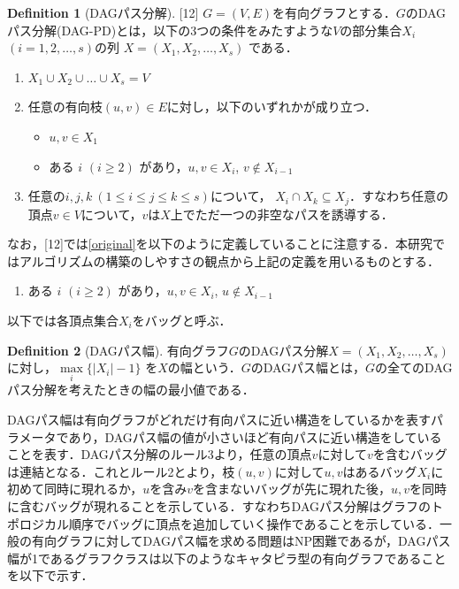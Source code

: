 \documentclass[master]{kuisthesis}		%
\theoremstyle{plain}
\theoremstyle{definition}
\newtheorem{definition*}{Definition}
\begin{document}
\begin{definition*}[DAGパス分解][12]
    $G=(V, E)$を有向グラフとする．$G$のDAGパス分解(DAG-PD)とは，以下の3つの条件をみたすような$V$の部分集合$X_i$ $(i = 1, 2,  \dots, s)$の列 $X=(X_1, X_2,  \dots, X_s)$ である．
    
    \begin{enumerate}
        \item $ X_1 \cup X_2 \cup \dots \cup X_s = V $ 
        \item 任意の有向枝$(u, v) \in E$に対し，以下のいずれかが成り立つ．
        \begin{itemize}
            \item $u, v \in X_1$
            \item ある $i$ $(i \geq 2)$ があり，$u, v \in X_i$, $v \notin X_{i-1}$ \label{original}
        \end{itemize}
        \item 任意の$ i, j, k\ (1 \leq i \leq j \leq k \leq s)$について， $X_i \cap X_k \subseteq X_j$．すなわち任意の頂点$v \in V$について，$v$は$X$上でただ一つの非空なパスを誘導する．
    \end{enumerate}
    
\end{definition*}

なお，[12]では\ref{original}を以下のように定義していることに注意する．本研究ではアルゴリズムの構築のしやすさの観点から上記の定義を用いるものとする．
\begin{enumerate}
    \item ある $i$ $(i \geq 2)$ があり，$u, v \in X_i$, $u \notin X_{i-1}$ \label{original}
\end{enumerate}

以下では各頂点集合$X_i$をバッグと呼ぶ．

\begin{definition*}[DAGパス幅]
    有向グラフ$G$のDAGパス分解$X=(X_1, X_2,   \dots, X_s)$に対し，$ \underset{i}{\max} \{ |X_i|-1 \}$ を$X$の幅という．$G$のDAGパス幅とは，$G$の全てのDAGパス分解を考えたときの幅の最小値である．
\end{definition*}



DAGパス幅は有向グラフがどれだけ有向パスに近い構造をしているかを表すパラメータであり，DAGパス幅の値が小さいほど有向パスに近い構造をしていることを表す．DAGパス分解のルール3より，任意の頂点$v$に対して$v$を含むバッグは連結となる．これとルール2とより，枝$(u, v)$に対して$u, v$はあるバッグ$X_i$に初めて同時に現れるか，$u$を含み$v$を含まないバッグが先に現れた後，$u, v$を同時に含むバッグが現れることを示している．すなわちDAGパス分解はグラフのトポロジカル順序でバッグに頂点を追加していく操作であることを示している．一般の有向グラフに対してDAGパス幅を求める問題はNP困難であるが，DAGパス幅が1であるグラフクラスは以下のようなキャタピラ型の有向グラフであることを以下で示す．
\end{document}
